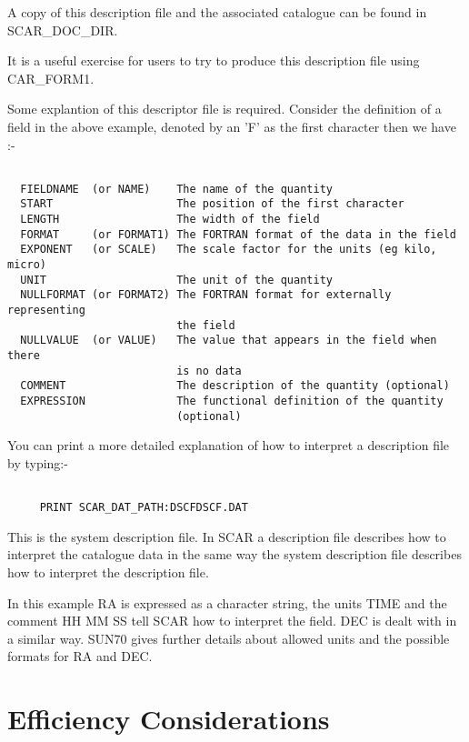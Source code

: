 A copy of this description file and the associated catalogue can be found in
SCAR\_DOC\_DIR.

It is a useful exercise for users to try to produce this description file using
CAR\_FORM1.

Some explantion of this descriptor file is required. Consider the definition
of a field in the above example, denoted by an 'F' as the first character then
we have :-

\begin{verbatim}

  FIELDNAME  (or NAME)    The name of the quantity
  START                   The position of the first character
  LENGTH                  The width of the field
  FORMAT     (or FORMAT1) The FORTRAN format of the data in the field
  EXPONENT   (or SCALE)   The scale factor for the units (eg kilo, micro)
  UNIT                    The unit of the quantity
  NULLFORMAT (or FORMAT2) The FORTRAN format for externally representing
                          the field
  NULLVALUE  (or VALUE)   The value that appears in the field when there
                          is no data
  COMMENT                 The description of the quantity (optional)
  EXPRESSION              The functional definition of the quantity
                          (optional)
\end{verbatim}

You can print a more detailed explanation of how to interpret a description
file by typing:-

\begin {verbatim}

     PRINT SCAR_DAT_PATH:DSCFDSCF.DAT

\end{verbatim}

This is the system description file.
In SCAR a description
file describes how to interpret the catalogue data in the same way the
system description file describes how to interpret the description file.

In this example RA is
expressed as a character string, the units TIME and the comment HH MM SS tell
SCAR how to interpret the field. DEC is dealt with in a similar way. SUN70 gives
further details about allowed units and the possible formats for RA and DEC.

\section{Efficiency Considerations}

